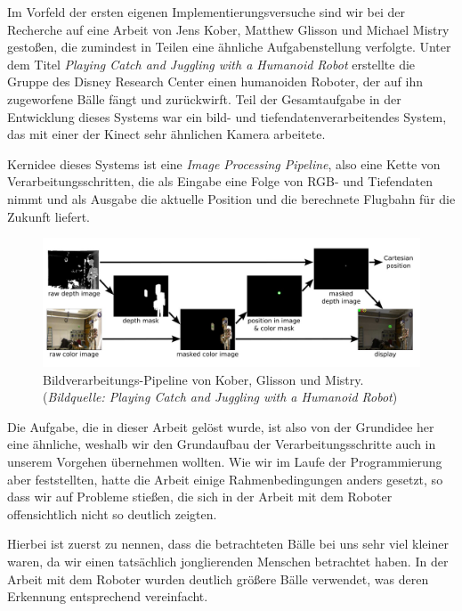 \documentclass[12pt,a4paper,ngerman]{scrartcl}
\begin{document}
Im Vorfeld der ersten eigenen Implementierungsversuche sind wir bei der
Recherche auf eine Arbeit von Jens Kober, Matthew Glisson und Michael Mistry
gestoßen, die zumindest in Teilen eine ähnliche Aufgabenstellung verfolgte.
Unter dem Titel {\em Playing Catch and Juggling with a Humanoid Robot}\cite{kober}
erstellte die Gruppe des Disney Research Center\cite{disneyresearch} einen
humanoiden Roboter, der auf ihn zugeworfene Bälle fängt und zurückwirft.
Teil der Gesamtaufgabe in der Entwicklung dieses Systems war ein
bild- und tiefendatenverarbeitendes System, das mit einer der Kinect sehr ähnlichen
Kamera arbeitete.

Kernidee dieses Systems ist eine \textit{Image Processing Pipeline}, also eine
Kette von Verarbeitungsschritten, die als Eingabe eine Folge von RGB- und Tiefendaten
nimmt und als Ausgabe die aktuelle Position und die berechnete Flugbahn für die Zukunft liefert.

\begin{figure}[H]
    \centering
    \includegraphics[scale=0.31]{img/koberpipeline.jpg}
    \caption{Bildverarbeitungs-Pipeline von Kober, Glisson und Mistry. ({\em Bildquelle: Playing Catch and Juggling with a Humanoid Robot\cite{kober}})}
    \label{koberpipeline}
\end{figure}

Die Aufgabe, die in dieser Arbeit gelöst wurde, ist also von der Grundidee her eine
ähnliche, weshalb wir den Grundaufbau der Verarbeitungsschritte auch in unserem
Vorgehen übernehmen wollten. Wie wir im Laufe der Programmierung aber feststellten,
hatte die Arbeit einige Rahmenbedingungen anders gesetzt, so dass wir auf Probleme
stießen, die sich in der Arbeit mit dem Roboter offensichtlich nicht so deutlich
zeigten.

Hierbei ist zuerst zu nennen, dass die betrachteten Bälle bei uns sehr viel kleiner
waren, da wir einen tatsächlich jonglierenden Menschen betrachtet haben. In der
Arbeit mit dem Roboter wurden deutlich größere Bälle verwendet, was deren Erkennung
entsprechend vereinfacht.
\end{document}

